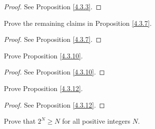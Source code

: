 \begin{proof}
    See Proposition \ref{4.3.3}.
\end{proof}

\begin{exercise}\label{ex 4.3.2}
    Prove the remaining claims in Proposition \ref{4.3.7}.
\end{exercise}

\begin{proof}
    See Proposition \ref{4.3.7}.
\end{proof}

\begin{exercise}\label{ex 4.3.3}
    Prove Proposition \ref{4.3.10}.
\end{exercise}

\begin{proof}
    See Proposition \ref{4.3.10}.
\end{proof}

\begin{exercise}
    Prove Proposition \ref{4.3.12}.
\end{exercise}

\begin{proof}
    See Proposition \ref{4.3.12}.
\end{proof}

\begin{exercise}\label{ex 4.3.5}
    Prove that \(2^N \geq N\) for all positive integers \(N\).
\end{exercise}

